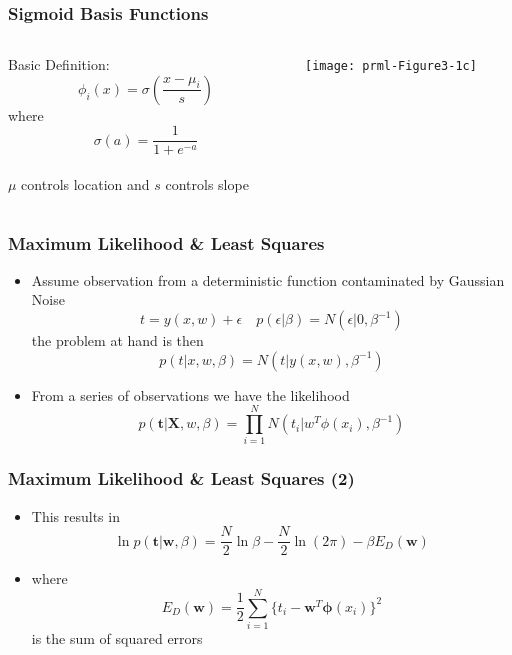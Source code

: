 \documentclass[10pt]{beamer}
\begin{document}
\begin{frame}
  \frametitle{Sigmoid Basis Functions}
  \begin{columns}
    \begin{column}{5cm}
      Basic Definition:
      \[
      \phi_i(x) = \sigma\left( \frac{x-\mu_i}{s} \right)
      \] where
      \[ \sigma(a) = \frac{1}{1+e^{-a}} \]
      \\
      $\mu$ controls location and $s$ controls slope
    \end{column}
    \begin{column}{5cm}
      \texttt{[image: prml-Figure3-1c]}
    \end{column}
  \end{columns}
\end{frame}

\begin{frame}
  \frametitle{Maximum Likelihood \& Least Squares}
  \begin{itemize}
  \item Assume observation from a deterministic function contaminated
    by Gaussian Noise
    \[
    t = y(x,w) + \epsilon \quad p(\epsilon|\beta) =
    N(\epsilon|0,\beta^{-1})
    \]
    the problem at hand is then
    \[
    p(t|x,w,\beta) = N(t|y(x,w),\beta^{-1})
    \]
  \item From a series of observations we have the likelihood
    \[
    p({\mathbf t}| {\mathbf X}, w, \beta) = \prod_{i=1}^N N(t_i|w^T\phi(x_i),\beta^{-1})
    \]
  \end{itemize}
\end{frame}

\begin{frame}
  \frametitle{Maximum Likelihood \& Least Squares (2)}
  \begin{itemize}
  \item This results in 
    \[
    \ln p({\mathbf t}|{\mathbf w}, \beta ) = \frac{N}{2} \ln \beta -
    \frac{N}{2} \ln (2\pi) - \beta E_D({\mathbf w})
    \]
  \item where
    \[
    E_D({\mathbf w}) = \frac{1}{2} \sum_{i=1}^{N} \{ t_i - {\mathbf
      w}^T{\mathbf \phi}(x_i)\}^2
    \]
    is the sum of squared errors
  \end{itemize}
\end{frame}
\end{document}
